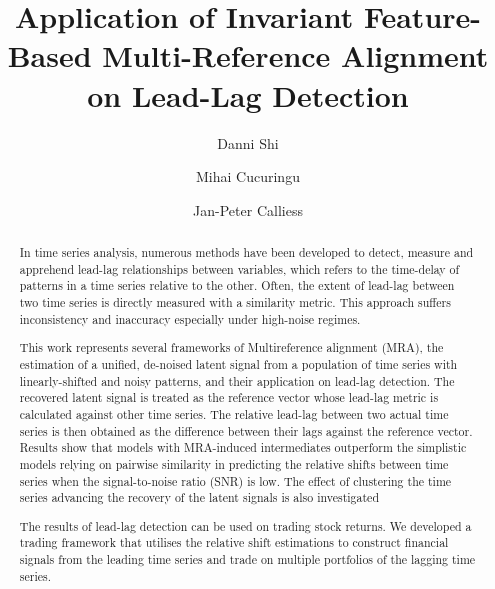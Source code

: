 \documentclass[sigconf]{acmart}
\begin{document}
\title{Application of Invariant Feature-Based Multi-Reference Alignment on Lead-Lag Detection}

\author{Danni Shi}

\author{Mihai Cucuringu}

\author{Jan-Peter Calliess}


\begin{abstract}
 In time series analysis, numerous methods have been developed to detect, measure and apprehend lead-lag relationships between variables, which refers to the time-delay of patterns in a time series relative to the other. Often, the extent of lead-lag between two time series is directly measured with a similarity metric. This approach suffers inconsistency and inaccuracy especially under high-noise regimes. 

This work represents several frameworks of Multireference alignment (MRA), the estimation of a unified, de-noised latent signal from a population of time series with linearly-shifted and noisy patterns, and their application on lead-lag detection. The recovered latent signal is treated as the reference vector whose lead-lag metric is calculated against 
other time series. The relative lead-lag between two actual time series is then obtained as the difference between their lags against the reference vector.  Results show that models with MRA-induced intermediates outperform the simplistic models relying on pairwise similarity in predicting the relative shifts between time series when the signal-to-noise ratio (SNR) is low. The effect of clustering the time series advancing the recovery of the latent signals is also investigated

The results of lead-lag detection can be used on trading stock returns. We developed a trading framework that utilises the relative shift estimations to construct financial signals from the leading time series and trade on multiple portfolios of the lagging time series. 
\end{abstract}
\end{document}
